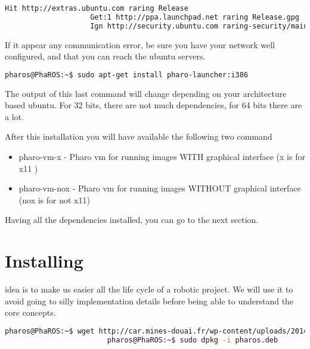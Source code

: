 \documentclass[a4paper,10pt,twoside]{book}
\begin{document}
				\begin{lstlisting}[language=bash,title={\installationTool{} Apt-get Update }]
					Hit http://extras.ubuntu.com raring Release                                                
					Get:1 http://ppa.launchpad.net raring Release.gpg [316 B]  
					Ign http://security.ubuntu.com raring-security/main Translation-en_US
				\end{lstlisting}
				
					If it appear any communication error, be sure you have your network well configured, and that you can reach the ubuntu servers.
				
				\begin{lstlisting}[language=bash,title={\installationTool{} Apt-get Update }]
					pharos@PhaROS:~$ sudo apt-get install pharo-launcher:i386
				\end{lstlisting}
				
				The output of this last command will change depending on your architecture based ubuntu. For 32 bits, there are not much dependencies, for 64 bits there are a lot. 
					
				After this installation you will have available the following two command
				
					\begin{itemize}
						\item pharo-vm-x		- Pharo vm for running images WITH graphical interface (x is for x11 )
						\item pharo-vm-nox		- Pharo vm for running images WITHOUT graphical interface (nox is for not x11)
					\end{itemize}
				
				Having all the dependencies installed, you can go to the next section.
				
				
				
				\newpage
				
				
			\section{Installing \installationTool{}}
					\installationTool{} idea is to make us easier all the life cycle of a robotic project. We will use it to avoid going to silly implementation details before being able to understand the core concepts. 					
					\begin{lstlisting}[language=bash,title={Installing \installationTool{}}]
						pharos@PhaROS:~$ wget http://car.mines-douai.fr/wp-content/uploads/2014/01/pharos.deb .
						pharos@PhaROS:~$ sudo dpkg -i pharos.deb
					\end{lstlisting}
				 	
\end{document}
